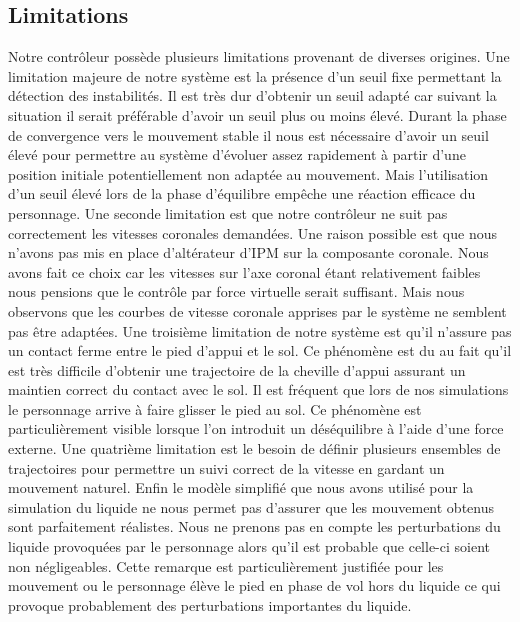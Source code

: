 \documentclass[runningheads,a4paper]{llncs}
\begin{document}
\subsection{Limitations}
Notre contrôleur possède plusieurs limitations provenant de diverses origines. 
Une limitation majeure de notre système est la présence d'un seuil fixe permettant la détection des instabilités. Il est très dur d'obtenir un seuil adapté car suivant la situation il serait préférable d'avoir un seuil plus ou moins élevé. Durant la phase de convergence vers le mouvement stable il nous est nécessaire d'avoir un seuil élevé pour permettre au système d'évoluer assez rapidement à partir d'une position initiale potentiellement non adaptée au mouvement. Mais l'utilisation d'un seuil élevé lors de la phase d'équilibre empêche  une réaction efficace du personnage. 
Une seconde limitation est que notre contrôleur ne suit pas correctement les vitesses coronales demandées. Une raison possible est que nous n'avons pas mis en place d'altérateur d'IPM sur la composante coronale. Nous avons fait ce choix car les vitesses sur l'axe coronal étant relativement faibles nous pensions que le contrôle par force virtuelle serait suffisant. Mais nous observons que les courbes de vitesse coronale apprises par le système ne semblent pas être adaptées.
Une troisième limitation de notre système est qu'il n'assure pas un contact ferme entre le pied d'appui et le sol. Ce phénomène est du au fait qu'il est très difficile d'obtenir une trajectoire de la cheville d'appui assurant un maintien correct du contact avec le sol. Il est fréquent que lors de nos simulations le personnage arrive à faire glisser le pied au sol. Ce phénomène est particulièrement visible lorsque l'on introduit un déséquilibre à l'aide d'une force externe. 
Une quatrième limitation est le besoin de définir plusieurs ensembles de trajectoires pour permettre un suivi correct de la vitesse en gardant un mouvement naturel. 
Enfin le modèle simplifié que nous avons utilisé pour la simulation du liquide ne nous permet pas d'assurer que les mouvement obtenus sont parfaitement réalistes. Nous ne prenons pas en compte les perturbations du liquide provoquées par le personnage alors qu'il est probable que celle-ci soient non négligeables. Cette remarque est particulièrement justifiée pour les mouvement ou le personnage élève le pied en phase de vol hors du liquide ce qui provoque probablement des perturbations importantes du liquide.
\end{document}
